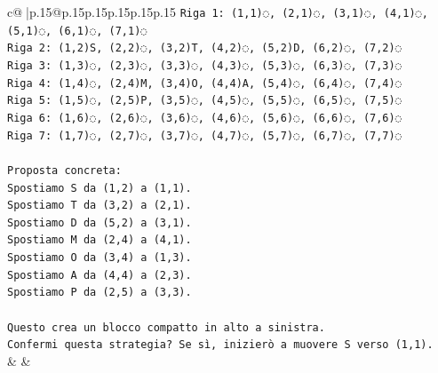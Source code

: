 \documentclass{article}
\begin{document}
{\begin{supertabular}{c@{$\;$}|p{.15\linewidth}@{}p{.15\linewidth}p{.15\linewidth}p{.15\linewidth}p{.15\linewidth}p{.15\linewidth}}
{{{\texttt{Riga 1: (1,1)◌, (2,1)◌, (3,1)◌, (4,1)◌, (5,1)◌, (6,1)◌, (7,1)◌} \\
\texttt{Riga 2: (1,2)S, (2,2)◌, (3,2)T, (4,2)◌, (5,2)D, (6,2)◌, (7,2)◌} \\
\texttt{Riga 3: (1,3)◌, (2,3)◌, (3,3)◌, (4,3)◌, (5,3)◌, (6,3)◌, (7,3)◌} \\
\texttt{Riga 4: (1,4)◌, (2,4)M, (3,4)O, (4,4)A, (5,4)◌, (6,4)◌, (7,4)◌} \\
\texttt{Riga 5: (1,5)◌, (2,5)P, (3,5)◌, (4,5)◌, (5,5)◌, (6,5)◌, (7,5)◌} \\
\texttt{Riga 6: (1,6)◌, (2,6)◌, (3,6)◌, (4,6)◌, (5,6)◌, (6,6)◌, (7,6)◌} \\
\texttt{Riga 7: (1,7)◌, (2,7)◌, (3,7)◌, (4,7)◌, (5,7)◌, (6,7)◌, (7,7)◌} \\
\\ 
\texttt{Proposta concreta:} \\
\texttt{Spostiamo S da (1,2) a (1,1).} \\
\texttt{Spostiamo T da (3,2) a (2,1).} \\
\texttt{Spostiamo D da (5,2) a (3,1).} \\
\texttt{Spostiamo M da (2,4) a (4,1).} \\
\texttt{Spostiamo O da (3,4) a (1,3).} \\
\texttt{Spostiamo A da (4,4) a (2,3).} \\
\texttt{Spostiamo P da (2,5) a (3,3).} \\
\\ 
\texttt{Questo crea un blocco compatto in alto a sinistra.} \\
\texttt{Confermi questa strategia? Se sì, inizierò a muovere S verso (1,1).} \\
            }
        }
    }
    & & \\ \\


\end{supertabular}}
\end{document}
